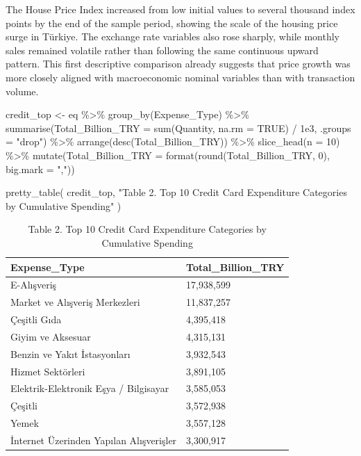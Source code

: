 \documentclass[
  11pt,
  a4paper,
  DIV=11,
  numbers=noendperiod]{scrartcl}
\newenvironment{Shaded}{\begin{snugshade}}{\end{snugshade}}
\newcommand{\AttributeTok}[1]{\textcolor[rgb]{0.40,0.45,0.13}{#1}}
\newcommand{\ConstantTok}[1]{\textcolor[rgb]{0.56,0.35,0.01}{#1}}
\newcommand{\DecValTok}[1]{\textcolor[rgb]{0.68,0.00,0.00}{#1}}
\newcommand{\FloatTok}[1]{\textcolor[rgb]{0.68,0.00,0.00}{#1}}
\newcommand{\FunctionTok}[1]{\textcolor[rgb]{0.28,0.35,0.67}{#1}}
\newcommand{\NormalTok}[1]{\textcolor[rgb]{0.00,0.23,0.31}{#1}}
\newcommand{\OtherTok}[1]{\textcolor[rgb]{0.00,0.23,0.31}{#1}}
\newcommand{\SpecialCharTok}[1]{\textcolor[rgb]{0.37,0.37,0.37}{#1}}
\newcommand{\StringTok}[1]{\textcolor[rgb]{0.13,0.47,0.30}{#1}}
\begin{document}
The House Price Index increased from low initial values to several
thousand index points by the end of the sample period, showing the scale
of the housing price surge in Türkiye. The exchange rate variables also
rose sharply, while monthly sales remained volatile rather than
following the same continuous upward pattern. This first descriptive
comparison already suggests that price growth was more closely aligned
with macroeconomic nominal variables than with transaction volume.

\begin{Shaded}
\begin{Highlighting}[]
\NormalTok{credit\_top }\OtherTok{\textless{}{-}}\NormalTok{ eq }\SpecialCharTok{\%\textgreater{}\%}
  \FunctionTok{group\_by}\NormalTok{(Expense\_Type) }\SpecialCharTok{\%\textgreater{}\%}
  \FunctionTok{summarise}\NormalTok{(}\AttributeTok{Total\_Billion\_TRY =} \FunctionTok{sum}\NormalTok{(Quantity, }\AttributeTok{na.rm =} \ConstantTok{TRUE}\NormalTok{) }\SpecialCharTok{/} \FloatTok{1e3}\NormalTok{, }\AttributeTok{.groups =} \StringTok{"drop"}\NormalTok{) }\SpecialCharTok{\%\textgreater{}\%}
  \FunctionTok{arrange}\NormalTok{(}\FunctionTok{desc}\NormalTok{(Total\_Billion\_TRY)) }\SpecialCharTok{\%\textgreater{}\%}
  \FunctionTok{slice\_head}\NormalTok{(}\AttributeTok{n =} \DecValTok{10}\NormalTok{) }\SpecialCharTok{\%\textgreater{}\%}
  \FunctionTok{mutate}\NormalTok{(}\AttributeTok{Total\_Billion\_TRY =} \FunctionTok{format}\NormalTok{(}\FunctionTok{round}\NormalTok{(Total\_Billion\_TRY, }\DecValTok{0}\NormalTok{), }\AttributeTok{big.mark =} \StringTok{","}\NormalTok{))}

\FunctionTok{pretty\_table}\NormalTok{(}
\NormalTok{  credit\_top,}
  \StringTok{"Table 2. Top 10 Credit Card Expenditure Categories by Cumulative Spending"}
\NormalTok{)}
\end{Highlighting}
\end{Shaded}

\begin{longtable}[t]{ll}
\caption{\label{tab:eda-credit-top}Table 2. Top 10 Credit Card Expenditure Categories by Cumulative Spending}\\
\toprule
Expense\_Type & Total\_Billion\_TRY\\
\midrule
E-Alışveriş & 17,938,599\\
Market ve Alışveriş Merkezleri & 11,837,257\\
Çeşitli Gıda & 4,395,418\\
Giyim ve Aksesuar & 4,315,131\\
Benzin ve Yakıt İstasyonları & 3,932,543\\
\addlinespace
Hizmet Sektörleri & 3,891,105\\
Elektrik-Elektronik Eşya / Bilgisayar & 3,585,053\\
Çeşitli & 3,572,938\\
Yemek & 3,557,128\\
İnternet Üzerinden Yapılan Alışverişler & 3,300,917\\
\bottomrule
\end{longtable}
\end{document}
